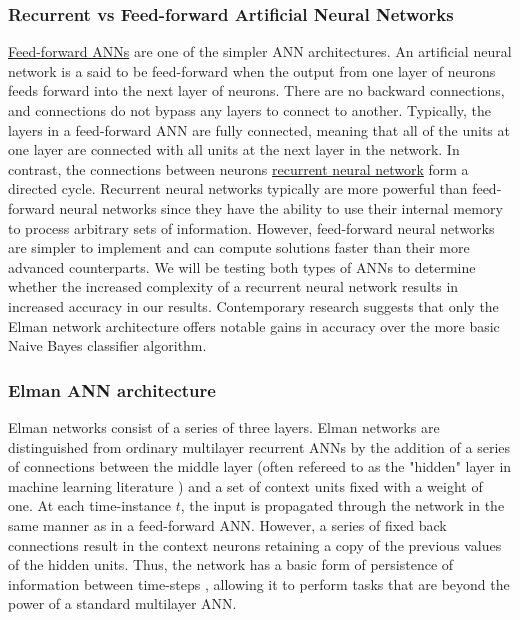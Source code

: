 \documentclass{article}
\begin{document}
\subsubsection{Recurrent vs Feed-forward Artificial Neural Networks}
\underline{Feed-forward ANNs} are one of the simpler ANN architectures. An artificial neural network is a said to be feed-forward when the output from one layer of neurons feeds forward into the next layer of neurons. There are no backward connections, and connections do not bypass any layers to connect to another. Typically, the layers in a feed-forward ANN are fully connected, meaning that all of the units at one layer are connected with all units at the next layer in the network. In contrast, the connections between neurons \underline{recurrent neural network}  form a directed cycle. Recurrent neural networks typically are more powerful than feed-forward neural networks since they have the ability to use their internal memory to process arbitrary sets of information. However, feed-forward neural networks are simpler to implement and can compute solutions faster than their more advanced counterparts. We will be testing both types of ANNs to determine whether the increased complexity of a recurrent neural network results in increased accuracy in our results.  Contemporary research suggests that only the Elman network architecture \citep{Smith_grammarinference} offers notable gains in accuracy over the more basic Naive Bayes classifier algorithm.
\subsubsection{Elman ANN architecture}
Elman networks consist of a series of three layers. Elman networks are distinguished from ordinary multilayer recurrent ANNs by the addition of a series of connections between the middle layer (often refereed to as the "hidden" layer in machine learning literature \citep{neuralnets}) and a set of context units fixed with a weight of one. At each time-instance $t$, the input is propagated through the network in the same manner as in a feed-forward ANN. However, a series of fixed back connections result in the context neurons retaining a copy of the previous values of the hidden units. Thus, the network has a basic form of persistence of information between time-steps \citep{Smola08introductionto}, allowing it to perform tasks that are beyond the power of a standard multilayer ANN.  
\end{document}
